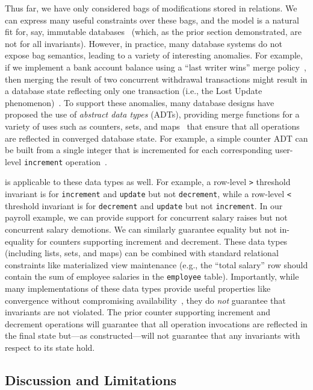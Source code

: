Thus far, we have only considered bags of modifications stored in
relations. We can express many useful constraints over these bags, and
the model is a natural fit for, say, immutable
databases~\cite{gray-virtues} (which, as the prior section
demonstrated, are not \iconfluent for all invariants). However, in
practice, many database systems do not expose bag semantics, leading
to a variety of interesting anomalies. For example, if we implement a
bank account balance using a ``last writer wins'' merge
policy~\cite{vogels-defs}, then merging the result of two concurrent
withdrawal transactions might result in a database state reflecting
only one transaction (i.e., the Lost Update
phenomenon)~\cite{adya-isolation,hat-vldb}. To support these
anomalies, many database designs have proposed the use of
\textit{abstract data types} (ADTs), providing merge functions for a
variety of uses such as counters, sets, and
maps~\cite{crdt,atomictransactions,weihl-thesis,blooml} that ensure
that all operations are reflected in converged database state. For
example, a simple counter ADT can be built from a single integer that
is incremented for each corresponding user-level \texttt{increment}
operation~\cite{crdt}.

\iconfluence is applicable to these data types as well. For example, a
row-level \texttt{>} threshold invariant is \iconfluent for
\texttt{increment} and \texttt{update} but not \texttt{decrement},
while a row-level \texttt{<} threshold invariant is \iconfluent for
\texttt{decrement} and \texttt{update} but not \texttt{increment}. In
our payroll example, we can provide \cfree support for concurrent
salary raises but not concurrent salary demotions. We can similarly
guarantee equality but not in-equality for counters supporting
increment and decrement. These data types (including lists, sets, and
maps) can be combined with standard relational constraints like
materialized view maintenance (e.g., the ``total salary'' row should
contain the sum of employee salaries in the \texttt{employee}
table). Importantly, while many implementations of these data types
provide useful properties like convergence without compromising
availability~\cite{blooml,crdt}, they do \textit{not} guarantee that
invariants are not violated. The prior counter supporting increment
and decrement operations will guarantee that all operation invocations
are reflected in the final state but---as constructed---will not
guarantee that any invariants with respect to its state hold.

\subsection{Discussion and Limitations}

